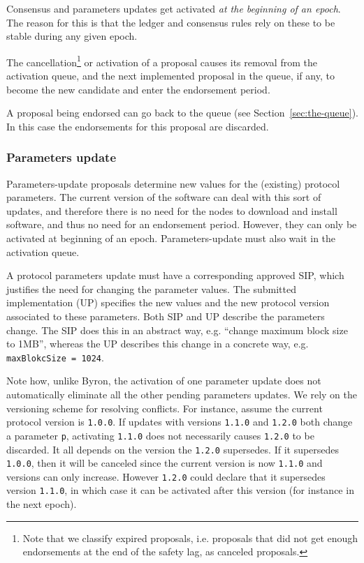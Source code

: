 Consensus and parameters updates get activated \emph{at the beginning of an
  epoch}. The reason for this is that the ledger and consensus rules rely on
these to be stable during any given epoch.

The cancellation\footnote{Note that we classify expired proposals, i.e.
  proposals that did not get enough endorsements at the end of the safety lag,
  as canceled proposals.} or activation of a proposal causes its removal from
the activation queue, and the next implemented proposal in the queue, if any, to
become the new candidate and enter the endorsement period.

A proposal being endorsed can go back to the queue (see
Section~\ref{sec:the-queue}). In this case the endorsements for this proposal
are discarded.

\subsubsection{Parameters update}
\label{sec:parameters-update}

Parameters-update proposals determine new values for the (existing) protocol
parameters. The current version of the software can deal with this sort of
updates, and therefore there is no need for the nodes to download and install
software, and thus no need for an endorsement period. However, they can only be
activated at beginning of an epoch. Parameters-update must also wait in the
activation queue.

A protocol parameters update must have a corresponding approved SIP, which
justifies the need for changing the parameter values. The submitted
implementation (UP) specifies the new values and the new protocol version
associated to these parameters. Both SIP and UP describe the parameters change.
The SIP does this in an abstract way, e.g. ``change maximum block size to 1MB'',
whereas the UP describes this change in a concrete way, e.g.
\texttt{maxBlokcSize = 1024}.

Note how, unlike Byron, the activation of one parameter update does not
automatically eliminate all the other pending parameters updates. We rely on the
versioning scheme for resolving conflicts. For instance, assume the current
protocol version is \texttt{1.0.0}. If updates with versions \texttt{1.1.0} and
\texttt{1.2.0} both change a parameter \texttt{p}, activating \texttt{1.1.0}
does not necessarily causes \texttt{1.2.0} to be discarded. It all depends on
the version the \texttt{1.2.0} supersedes. If it supersedes \texttt{1.0.0}, then
it will be canceled since the current version is now \texttt{1.1.0} and versions
can only increase. However \texttt{1.2.0} could declare that it supersedes
version \texttt{1.1.0}, in which case it can be activated after this version
(for instance in the next epoch).

